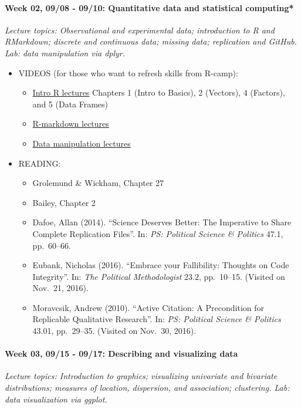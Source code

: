 \documentclass[11pt]{article}
\providecommand{\tightlist}{%
  \setlength{\itemsep}{0pt}\setlength{\parskip}{0pt}}
\begin{document}
\paragraph{Week 02, 09/08 - 09/10: Quantitative data and statistical computing*\\}
\emph{Lecture topics: Observational and experimental data; introduction to R and RMarkdown; discrete and continuous data; missing data; replication and GitHub. Lab: data manipulation via dplyr.}\\

\begin{itemize}
\tightlist
  \item
  VIDEOS (for those who want to refresh skills from R-camp):
  \begin{itemize}
  \tightlist
  \item 
  \href{https://www.datacamp.com/courses/free-introduction-to-r-beta}{Intro
    R lectures} Chapters 1 (Intro to Basics), 2 (Vectors), 4 (Factors),
    and 5 (Data Frames)
  \item
    \href{https://www.datacamp.com/courses/reporting-with-r-markdown}{R-markdown
    lectures}
      \item \href{https://www.datacamp.com/courses/dplyr-data-manipulation-r-tutorial}{Data
    manipulation lectures}
  \end{itemize}
\item
  READING:
  \begin{itemize}
    \item
    Grolemund \& Wickham, Chapter 27
  \item
    Bailey, Chapter 2
  \item
    Dafoe, Allan (2014). ``Science Deserves Better: The Imperative to
    Share Complete Replication Files''. In:
    \emph{PS: Political Science \& Politics} 47.1, pp.~60--66.
  \item
    Eubank, Nicholas (2016). ``Embrace your Fallibility: Thoughts on
    Code Integrity''. In: \emph{The Political Methodologist} 23.2,
    pp.~10--15. (Visited on Nov.~21, 2016).
  \item
    Moravcsik, Andrew (2010). ``Active Citation: A Precondition for
    Replicable Qualitative Research''. In:
    \emph{PS: Political Science \& Politics} 43.01, pp.~29--35. (Visited
    on Nov.~30, 2016).
  \end{itemize}
\end{itemize}

\paragraph{Week 03, 09/15 - 09/17: Describing and visualizing data\\}
\emph{Lecture topics: Introduction to graphics; visualizing univariate and bivariate distributions; measures of location, dispersion, and association; clustering. Lab: data visualization via ggplot.}\\
\end{document}
